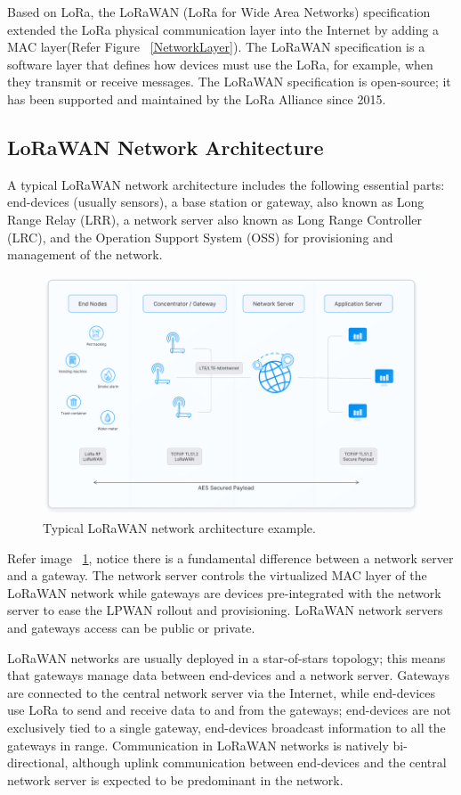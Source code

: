 Based on LoRa, the LoRaWAN (LoRa for Wide Area Networks) specification extended the LoRa physical communication layer into the Internet by adding a MAC layer(Refer Figure ~\ref{NetworkLayer}). The LoRaWAN specification is a software layer that defines how devices must use the LoRa, for example, when they transmit or receive messages. The LoRaWAN specification is open-source; it has been supported and maintained by the LoRa Alliance since 2015. \cite{ArduinoLoRaWAN101:2024}

\subsection{LoRaWAN Network Architecture}

A typical LoRaWAN network architecture includes the following essential parts: end-devices (usually sensors), a base station or gateway, also known as Long Range Relay (LRR), a network server also known as Long Range Controller (LRC), and the Operation Support System (OSS) for provisioning and management of the network.
\cite{ArduinoLoRaWAN101:2024}

\begin{figure}
	\begin{center}
		\includegraphics[width=0.7\linewidth]{Images/LORA/LoRaWANArch.png}
		\caption{Typical LoRaWAN network architecture example.}
		\label{LoRaWANArch} 
	\end{center}
\end{figure}

Refer image ~\ref{LoRaWANArch}, notice there is a fundamental difference between a network server and a gateway. The network server controls the virtualized MAC layer of the LoRaWAN network while gateways are devices pre-integrated with the network server to ease the LPWAN rollout and provisioning. LoRaWAN network servers and gateways access can be public or private. 

LoRaWAN networks are usually deployed in a star-of-stars topology; this means that gateways manage data between end-devices and a network server. Gateways are connected to the central network server via the Internet, while end-devices use LoRa to send and receive data to and from the gateways; end-devices are not exclusively tied to a single gateway, end-devices broadcast information to all the gateways in range. Communication in LoRaWAN networks is natively bi-directional, although uplink communication between end-devices and the central network server is expected to be predominant in the network. \cite{ArduinoLoRaWAN101:2024}

